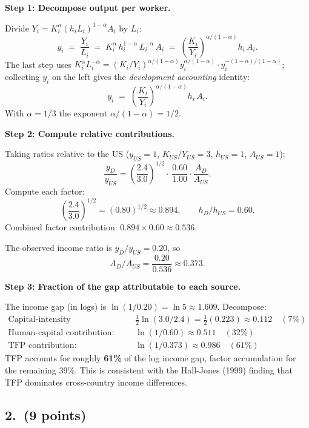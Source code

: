 \documentclass[a4paper,11pt]{article}
\begin{document}
\begin{answerbox}
\textbf{Step 1: Decompose output per worker.}

Divide $Y_i = K_i^{\alpha}(h_i L_i)^{1-\alpha} A_i$ by $L_i$:
\[
    y_i \;=\; \frac{Y_i}{L_i} \;=\; K_i^{\alpha}\,h_i^{1-\alpha}\,L_i^{-\alpha}\,A_i
    \;=\; \left(\frac{K_i}{Y_i}\right)^{\!\alpha/(1-\alpha)} h_i\,A_i.
\]
The last step uses $K_i^{\alpha} L_i^{-\alpha} = (K_i/Y_i)^{\alpha/(1-\alpha)} y_i^{\alpha/(1-\alpha)} \cdot y_i^{-(1-\alpha)/(1-\alpha)}$; collecting $y_i$ on the left gives the \emph{development accounting} identity:
\[
    \boxed{y_i \;=\; \left(\frac{K_i}{Y_i}\right)^{\!\alpha/(1-\alpha)} h_i\, A_i.}
\]
With $\alpha = 1/3$ the exponent $\alpha/(1-\alpha) = 1/2$.

\textbf{Step 2: Compute relative contributions.}

Taking ratios relative to the US ($y_{US}=1$, $K_{US}/Y_{US}=3$, $h_{US}=1$, $A_{US}=1$):
\[
    \frac{y_D}{y_{US}} = \left(\frac{2.4}{3.0}\right)^{1/2}\!\cdot\,\frac{0.60}{1.00}\cdot\frac{A_D}{A_{US}}.
\]
Compute each factor:
\[
    \left(\frac{2.4}{3.0}\right)^{1/2} = (0.80)^{1/2} \approx 0.894,
    \qquad h_D/h_{US} = 0.60.
\]
Combined factor contribution: $0.894 \times 0.60 \approx 0.536$.

The observed income ratio is $y_D/y_{US} = 0.20$, so
\[
    A_D/A_{US} = \frac{0.20}{0.536} \approx 0.373.
\]

\textbf{Step 3: Fraction of the gap attributable to each source.}

The income gap (in logs) is $\ln(1/0.20) = \ln 5 \approx 1.609$.  Decompose:
\begin{align*}
    \text{Capital-intensity contribution:} & \quad \tfrac{1}{2}\ln(3.0/2.4) = \tfrac{1}{2}(0.223) \approx 0.112 \quad (7\%) \\
    \text{Human-capital contribution:}     & \quad \ln(1/0.60) \approx 0.511 \quad (32\%) \\
    \text{TFP contribution:}               & \quad \ln(1/0.373) \approx 0.986 \quad (61\%)
\end{align*}
TFP accounts for roughly \textbf{61\%} of the log income gap, factor accumulation for the remaining 39\%.  This is consistent with the Hall-Jones (1999) finding that TFP dominates cross-country income differences.
\end{answerbox}

\subsection*{2.\ (9 points)}
\end{document}
